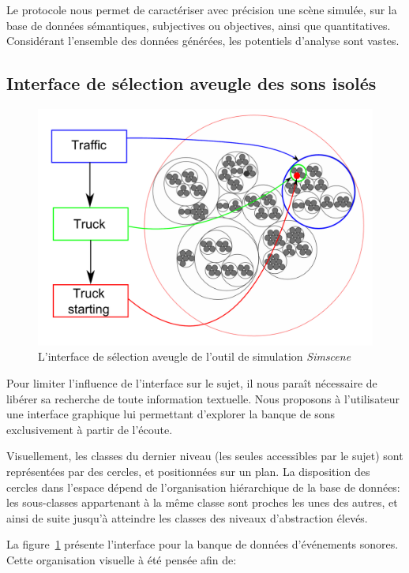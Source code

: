Le protocole nous permet de caractériser avec précision une scène simulée, sur la base de données sémantiques, subjectives ou objectives, ainsi que quantitatives. Considérant l'ensemble des données générées, les potentiels d'analyse sont vastes.



\subsection{Interface de sélection aveugle des sons isolés}
\label{sec:ch4_ssf}

\begin{figure}[t]
        \myfloatalign
        \includegraphics[width=.8\linewidth]{gfx/ch_4/SSF}
       \caption{L'interface de sélection aveugle de l'outil de simulation \emph{Simscene}}\label{fig:ssf}
\end{figure}

Pour limiter l’influence de l’interface sur le sujet, il nous paraît nécessaire de libérer sa recherche de toute information textuelle. Nous proposons à l'utilisateur une interface graphique lui permettant d’explorer la banque de sons exclusivement à partir de l’écoute.

Visuellement, les classes du dernier niveau (les seules accessibles par le sujet) sont représentées par des cercles, et positionnées sur un plan. La disposition des cercles dans l'espace dépend de l’organisation hiérarchique de la base de données: les sous-classes appartenant à la même classe sont proches les unes des autres, et ainsi de suite jusqu'à atteindre les classes des niveaux d'abstraction élevés.

La figure~\ref{fig:ssf} présente l'interface pour la banque de données d'événements sonores. Cette organisation visuelle à été pensée afin de:


